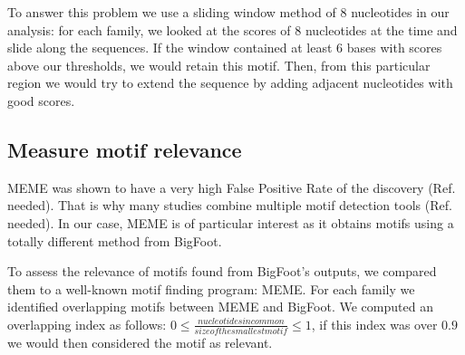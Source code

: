 To answer this problem we use a sliding window method of 8 nucleotides in our analysis: for each family, we looked at the scores of 8 nucleotides at the time and slide along the sequences. If the window contained at least 6 bases with scores above our thresholds, we would retain this motif. Then, from this particular region we would try to extend the sequence by adding adjacent nucleotides with good scores.


\subsection*{Measure motif relevance}

MEME was shown to have a very high False Positive Rate of the discovery (Ref. needed). That is why many studies combine multiple motif detection tools (Ref. needed). In our case, MEME is of particular interest as it obtains motifs using a totally different method from BigFoot.

To assess the relevance of motifs found from BigFoot's outputs, we compared them to a well-known motif finding program: MEME. For each family we identified overlapping motifs between MEME and BigFoot. We computed an overlapping index as follows: $0 \leq \frac{nucleotides in common}{size of the smallest motif} \leq 1$, if this index was over $0.9$ we would then considered the motif as relevant.